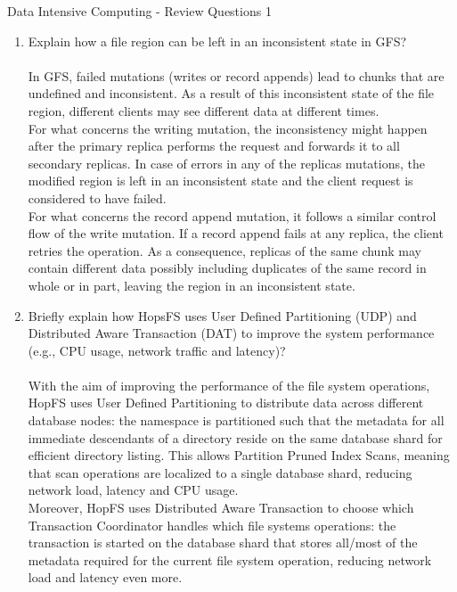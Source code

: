 \documentclass[]{report}
\begin{document}
\begin{center}
 {\Large Data Intensive Computing - Review Questions 1}
\end{center}
\vspace{1cm}
\justify
\begin{enumerate}
 \item Explain how a file region can be left in an inconsistent state in GFS?\\\\
In GFS, failed mutations (writes or record appends) lead to chunks that are undefined and inconsistent. As a result of this inconsistent state of the file region, different clients may see different data at different times. \\
For what concerns the writing mutation, the inconsistency might happen after the primary replica performs the request and forwards it to all secondary replicas. In case of errors in any of the replicas mutations, the modified region is left in an inconsistent state and the client request is considered to have failed. \\
For what concerns the record append mutation, it follows a similar control flow of the write mutation. If a record append fails at any replica, the client retries the operation. As a consequence, replicas of the same chunk may contain different data possibly including duplicates of the same record in whole or in part, leaving the region in an inconsistent state.
 
 \item Briefly explain how HopsFS uses User Defined Partitioning (UDP) and Distributed Aware Transaction (DAT) to improve the system performance (e.g., CPU usage, network traffic and latency)?\\\\
With the aim of improving the performance of the file system operations, HopFS uses User Defined Partitioning to distribute data across different database nodes: the namespace is partitioned such that the metadata for all immediate descendants of a directory reside on the same database shard for efficient directory listing. This allows Partition Pruned Index Scans, meaning that scan operations are localized to a single database shard, reducing network load, latency and CPU usage.\\
Moreover, HopFS uses Distributed Aware Transaction to choose which Transaction Coordinator handles which file systems operations: the transaction is started on the database shard that stores all/most of the metadata required for the current file system operation, reducing network load and latency even more.


\end{enumerate}
\end{document}
